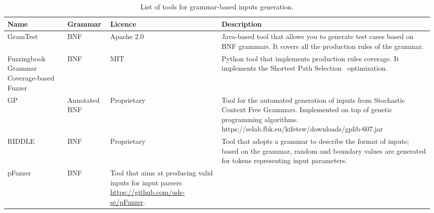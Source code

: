 \begin{table}[h]
\caption{List of tools for grammar-based inputs generation.}
\label{table:grammarGeneration}
\begin{center}
\tiny
\begin{tabular}{|p{2cm}|p{2cm}|p{2cm}|p{7cm}|}
\hline
\textbf{Name}&\textbf{Grammar}&\textbf{Licence}&\textbf{Description}\\
\hline
GramTest~\cite{GramTest}& BNF&Apache 2.0&Java-based tool that allows you to generate test cases based on BNF grammars. It covers all the production rules of the grammar.\\
\hline
Fuzzingbook Grammar Coverage-based Fuzzer~\cite{fuzzingbook2019:GrammarFuzzer}& BNF & MIT &Python tool that implements production rules coverage. It implements the Shortest Path Selection~\cite{Burkhardt:TestFromSyntax} optimization.\\
\hline
GP~\cite{GPlib,Kifetew:GBTest:2017}& Annotated BNF & Proprietary& Tool for the automated generation of inputs from Stochastic Context Free Grammars. Implemented on top of genetic programming algorithms. https://selab.fbk.eu/kifetew/downloads/gplib-607.jar\\
\hline
RIDDLE~\cite{ghosh1998testing}&BNF& Proprietary& Tool that adopts a grammar to describe the format of inputs; based on the grammar, random and boundary values are generated for tokens representing input parameters.\\
\hline
pFuzzer~\cite{mathis2019parser}& BNF & Tool that aims at producing valid inputs for input parsers \url{https://github.com/uds-se/pFuzzer}.\\
\hline
\end{tabular}
\end{center}
\end{table}%